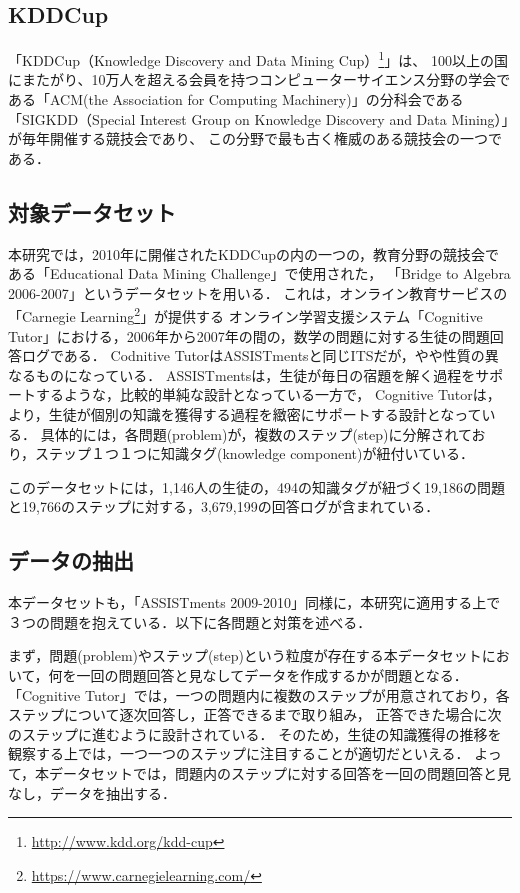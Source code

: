 \subsection{KDDCup}
「KDDCup（Knowledge Discovery and Data Mining Cup）\footnote{\url{http://www.kdd.org/kdd-cup}}」は、
100以上の国にまたがり、10万人を超える会員を持つコンピューターサイエンス分野の学会である「ACM(the Association for Computing Machinery)」の分科会である
「SIGKDD（Special Interest Group on Knowledge Discovery and Data Mining）」が毎年開催する競技会であり、
この分野で最も古く権威のある競技会の一つである．


\subsection{対象データセット}
本研究では，2010年に開催されたKDDCupの内の一つの，教育分野の競技会である「Educational Data Mining Challenge」で使用された，
「Bridge to Algebra 2006-2007」\cite{kddcup2010bridge2006}というデータセットを用いる．
これは，オンライン教育サービスの「Carnegie Learning\footnote{\url{https://www.carnegielearning.com/}}」が提供する
オンライン学習支援システム「Cognitive Tutor」における，2006年から2007年の間の，数学の問題に対する生徒の問題回答ログである．%
Codnitive TutorはASSISTmentsと同じITSだが，やや性質の異なるものになっている．
ASSISTmentsは，生徒が毎日の宿題を解く過程をサポートするような，比較的単純な設計となっている一方で，
Cognitive Tutorは，より，生徒が個別の知識を獲得する過程を緻密にサポートする設計となっている．
具体的には，各問題(problem)が，複数のステップ(step)に分解されており，ステップ１つ１つに知識タグ(knowledge component)が紐付いている．

このデータセットには，1,146人の生徒の，494の知識タグが紐づく19,186の問題と19,766のステップに対する，3,679,199の回答ログが含まれている．


\subsection{データの抽出}
本データセットも，「ASSISTments 2009-2010」同様に，本研究に適用する上で３つの問題を抱えている．以下に各問題と対策を述べる．

まず，問題(problem)やステップ(step)という粒度が存在する本データセットにおいて，何を一回の問題回答と見なしてデータを作成するかが問題となる．
「Cognitive Tutor」では，一つの問題内に複数のステップが用意されており，各ステップについて逐次回答し，正答できるまで取り組み，
正答できた場合に次のステップに進むように設計されている．
そのため，生徒の知識獲得の推移を観察する上では，一つ一つのステップに注目することが適切だといえる．
よって，本データセットでは，問題内のステップに対する回答を一回の問題回答と見なし，データを抽出する．

